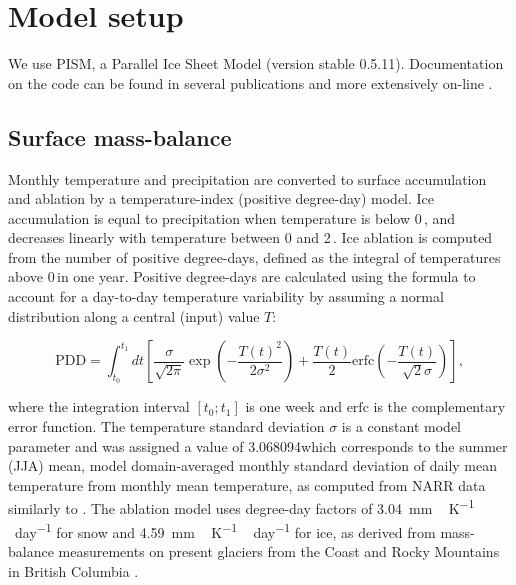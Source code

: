 \section{Model setup}
\label{sec:model}

We use PISM, a Parallel Ice Sheet Model (version stable 0.5.11). Documentation on the code can be found in several publications \citep[e.g.,][]{bueler-brown-2009,winkelmann-etal-2011,aschwanden-etal-2012} and more extensively on-line \citep[{\url{http://www.pism-docs.org}},][]{web:pism}.

\subsection{Surface mass-balance}

Monthly temperature and precipitation are converted to surface accumulation and ablation by a temperature-index (positive degree-day) model. Ice accumulation is equal to precipitation when temperature is below 0\,\degC, and decreases linearly with temperature between 0 and 2\,\degC. Ice ablation is computed from the number of positive degree-days, defined as the integral of temperatures above 0\,\degC in one year. Positive degree-days are calculated using the \citet{calov-greve-2005} formula to account for a day-to-day temperature variability by assuming a normal distribution along a central (input) value $T$:

\begin{equation}
	\mathrm{PDD} = \int_{t_0}^{t_1} dt \left[
		\frac{\sigma}{\sqrt{2\pi}}
		\exp\left({-\frac{T(t)^2}{2\sigma^2}}\right)
		+\frac{T(t)}{2}
		\mathrm{erfc} \left(-\frac{T(t)}{\sqrt{2}\sigma}\right)
	\right],
\end{equation}

where the integration interval $[t_0; t_1]$ is one week and $\mathrm{erfc}$ is the complementary error function. The temperature standard deviation $\sigma$  is a constant model parameter and was assigned a value of 3.068094\degC which corresponds to the summer (JJA) mean, model domain-averaged monthly standard deviation of daily mean temperature from monthly mean temperature, as computed from NARR data similarly to \citet{seguinot-inreview}. The ablation model uses degree-day factors of 3.04~\unit{mm\,K^{-1}\,day^{-1}} for snow and 4.59~\unit{mm\,K^{-1}\,day^{-1}} for ice, as derived from mass-balance measurements on present glaciers from the Coast and Rocky Mountains in British Columbia \citep{shea-etal-2009}.

